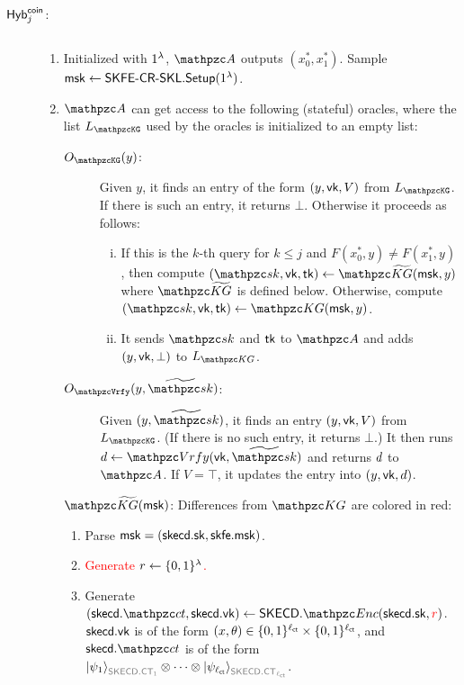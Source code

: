 \begin{description}
\item[$\mathsf{Hyb}_{j}^{\mathsf{coin}}$:] $ $
\begin{enumerate}
\item Initialized with $1^\lambda$, $\qA$ outputs $(x_0^*, x_1^*)$.
Sample $\mathsf{msk} \leftarrow \mathsf{SKFE}\textrm{-}\mathsf{CR}\textrm{-}\mathsf{SKL}.\mathsf{Setup}(1^\lambda)$.

\item $\qA$ can get access to the following (stateful) oracles,
where the list $\List{\qKG}$ used by the oracles is initialized
to an empty list:

\begin{description}
\item[$\Oracle{\qKG}(y)$:] Given $y$, it finds an entry of the form
$(y,\mathsf{vk},V)$ from $\List{\qKG}$. If there is such an entry, it
returns $\bot$. Otherwise it proceeds as follows:
\begin{enumerate}[(i)]
\item 
If this is the $k$-th query for $k \le j$
and $F(x_0^*, y) \neq F(x_1^*, y)$, then compute $(\qsk,
\vk, \tk) \gets \qKGt(\msk, y)$ where $\qKGt$ is defined below.
Otherwise, compute $(\qsk, \vk, \tk) \gets \qKG(\msk, y)$.

\item It sends $\qsk$ and $\mathsf{tk}$ to $\qA$ and adds $(y, \mathsf{vk}, \bot)$
to $L_{\qKG}$.
\end{enumerate}

\item[$\Oracle{\qVrfy}(y,\widetilde{\qsk})$:] Given
$(y,\widetilde{\qsk})$, it finds an entry $(y,\mathsf{vk},V)$ from
$\List{\qKG}$. (If there is no such entry, it returns $\bot$.) It
then runs $\decision \gets \qVrfy(\vk,\widetilde{\qsk})$ and returns
$d$ to $\qA$. If $V=\top$, it updates the entry into
$(y,\mathsf{vk},d)$. 
\end{description}

\item[$\qKGt(\msk)$:] Differences from $\qKG$ are colored in red:
\begin{enumerate}
    \item Parse $\mathsf{msk}=(\mathsf{skecd}.\mathsf{sk}, \mathsf{skfe}.\mathsf{msk})$.
    \item \textcolor{red}{Generate $r \leftarrow \{0,1\}^\lambda$.}
    \item Generate
        $(\skecd.\qct,\skecd.\vk)\gets\SKECD.\qEnc(\skecd.\sk,\textcolor{red}{r})$.
        $\mathsf{skecd}.\mathsf{vk}$ is of the form
        $(x,\theta)\in\{0,1\}^{\ell_{\mathsf{ct}}}\times\{0,1\}^{\ell_{\mathsf{ct}}}$, and
        $\skecd.\qct$ is of the form
        $\ket{\psi_1}_{\qreg{SKECD.CT_1}}\tensor\cdots\tensor\ket{\psi_{\ctlen}}_{\qreg{SKECD.CT_{\ctlen}}}$.


\end{enumerate}
\end{enumerate}
\end{description}
